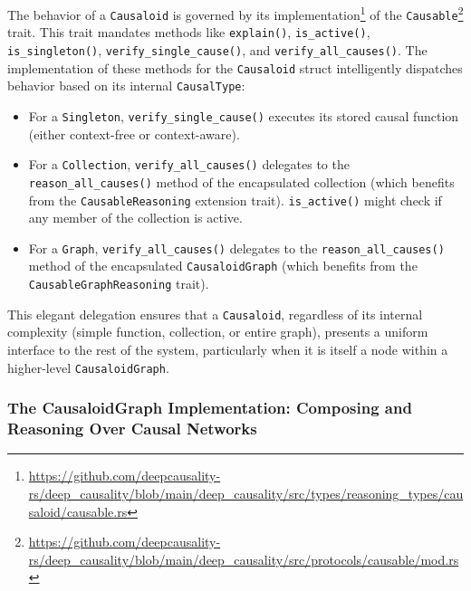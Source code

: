 The behavior of a \texttt{Causaloid} is governed by its implementation\footnote{\url{https://github.com/deepcausality-rs/deep_causality/blob/main/deep_causality/src/types/reasoning_types/causaloid/causable.rs}}  of the \texttt{Causable}\footnote{\url{https://github.com/deepcausality-rs/deep_causality/blob/main/deep_causality/src/protocols/causable/mod.rs}} trait. This trait mandates methods like \texttt{explain()}, \texttt{is\_active()}, \texttt{is\_singleton()}, \texttt{verify\_single\_cause()}, and \texttt{verify\_all\_causes()}. The implementation of these methods for the \texttt{Causaloid} struct intelligently dispatches behavior based on its internal \texttt{CausalType}:
\begin{itemize}
    \item For a \texttt{Singleton}, \texttt{verify\_single\_cause()} executes its stored causal function (either context-free or context-aware).
    \item For a \texttt{Collection}, \texttt{verify\_all\_causes()} delegates to the \texttt{reason\_all\_causes()} method of the encapsulated collection (which benefits from the \texttt{CausableReasoning} extension trait). \texttt{is\_active()} might check if any member of the collection is active.
    \item For a \texttt{Graph}, \texttt{verify\_all\_causes()} delegates to the \texttt{reason\_all\_causes()} method of the encapsulated \texttt{CausaloidGraph} (which benefits from the \texttt{CausableGraphReasoning} trait).
\end{itemize}
This elegant delegation ensures that a \texttt{Causaloid}, regardless of its internal complexity (simple function, collection, or entire graph), presents a uniform interface to the rest of the system, particularly when it is itself a node within a higher-level \texttt{CausaloidGraph}.

\newpage

\subsubsection{The CausaloidGraph Implementation: Composing and Reasoning Over Causal Networks}
\label{subsubsec:causaloidgraph_implementation}

